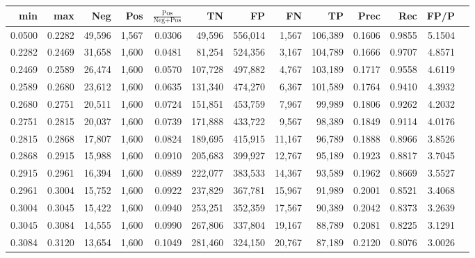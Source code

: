 \begin{tabular}{rrrrrrrrrrrrr}
\toprule
   min &    max &    Neg &   Pos & $\frac{\text{Pos}}{\text{Neg}+\text{Pos}}$ &      TN &      FP &      FN &      TP &   Prec &    Rec &   FP/P \\
\midrule
0.0500 & 0.2282 & 49,596 & 1,567 &                                     0.0306 &  49,596 & 556,014 &   1,567 & 106,389 & 0.1606 & 0.9855 & 5.1504 \\
0.2282 & 0.2469 & 31,658 & 1,600 &                                     0.0481 &  81,254 & 524,356 &   3,167 & 104,789 & 0.1666 & 0.9707 & 4.8571 \\
0.2469 & 0.2589 & 26,474 & 1,600 &                                     0.0570 & 107,728 & 497,882 &   4,767 & 103,189 & 0.1717 & 0.9558 & 4.6119 \\
0.2589 & 0.2680 & 23,612 & 1,600 &                                     0.0635 & 131,340 & 474,270 &   6,367 & 101,589 & 0.1764 & 0.9410 & 4.3932 \\
0.2680 & 0.2751 & 20,511 & 1,600 &                                     0.0724 & 151,851 & 453,759 &   7,967 &  99,989 & 0.1806 & 0.9262 & 4.2032 \\
0.2751 & 0.2815 & 20,037 & 1,600 &                                     0.0739 & 171,888 & 433,722 &   9,567 &  98,389 & 0.1849 & 0.9114 & 4.0176 \\
0.2815 & 0.2868 & 17,807 & 1,600 &                                     0.0824 & 189,695 & 415,915 &  11,167 &  96,789 & 0.1888 & 0.8966 & 3.8526 \\
0.2868 & 0.2915 & 15,988 & 1,600 &                                     0.0910 & 205,683 & 399,927 &  12,767 &  95,189 & 0.1923 & 0.8817 & 3.7045 \\
0.2915 & 0.2961 & 16,394 & 1,600 &                                     0.0889 & 222,077 & 383,533 &  14,367 &  93,589 & 0.1962 & 0.8669 & 3.5527 \\
0.2961 & 0.3004 & 15,752 & 1,600 &                                     0.0922 & 237,829 & 367,781 &  15,967 &  91,989 & 0.2001 & 0.8521 & 3.4068 \\
0.3004 & 0.3045 & 15,422 & 1,600 &                                     0.0940 & 253,251 & 352,359 &  17,567 &  90,389 & 0.2042 & 0.8373 & 3.2639 \\
0.3045 & 0.3084 & 14,555 & 1,600 &                                     0.0990 & 267,806 & 337,804 &  19,167 &  88,789 & 0.2081 & 0.8225 & 3.1291 \\
0.3084 & 0.3120 & 13,654 & 1,600 &                                     0.1049 & 281,460 & 324,150 &  20,767 &  87,189 & 0.2120 & 0.8076 & 3.0026 \\

\end{tabular}
